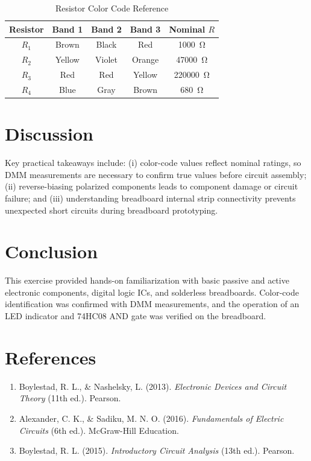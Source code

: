 \begin{table}[h!]
	\centering
	\caption{Resistor Color Code Reference}
	\vspace{2mm}
	\begin{tabular}{ccccc}
		\toprule
		\rowcolor{blue!10}
		\textbf{Resistor} & \textbf{Band 1} & \textbf{Band 2} & \textbf{Band 3} & \textbf{Nominal $R$} \\
		\midrule
		$R_1$ & Brown & Black & Red & \qty{1000}{\ohm} \\
		$R_2$ & Yellow & Violet & Orange & \qty{47000}{\ohm} \\
		$R_3$ & Red & Red & Yellow & \qty{220000}{\ohm} \\
		$R_4$ & Blue & Gray & Brown & \qty{680}{\ohm} \\
		\bottomrule
	\end{tabular}
	\label{tab:rescolor}
\end{table}

\section{Discussion}
Key practical takeaways include: (i) color-code values reflect nominal ratings, so DMM measurements are necessary to confirm true values before circuit assembly; (ii) reverse-biasing polarized components leads to component damage or circuit failure; and (iii) understanding breadboard internal strip connectivity prevents unexpected short circuits during breadboard prototyping.

\section{Conclusion}
This exercise provided hands-on familiarization with basic passive and active electronic components, digital logic ICs, and solderless breadboards. Color-code identification was confirmed with DMM measurements, and the operation of an LED indicator and 74HC08 AND gate was verified on the breadboard.

\section{References}
\begin{tcolorbox}[colback=gray!5, colframe=gray!40, arc=2mm]
	\begin{enumerate}
		\item Boylestad, R. L., \& Nashelsky, L. (2013). \textit{Electronic Devices and Circuit Theory} (11th ed.). Pearson.
		\item Alexander, C. K., \& Sadiku, M. N. O. (2016). \textit{Fundamentals of Electric Circuits} (6th ed.). McGraw-Hill Education.
		\item Boylestad, R. L. (2015). \textit{Introductory Circuit Analysis} (13th ed.). Pearson.
	\end{enumerate}
\end{tcolorbox}